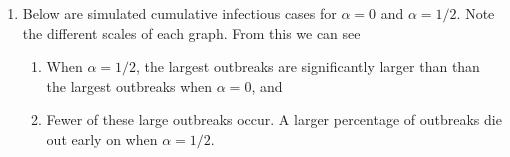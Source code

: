 \documentclass[10pt]{article}
\begin{document}
\begin{enumerate}
\begin{enumerate}
	\item 
		Below are simulated cumulative infectious cases for $\alpha=0$ and $\alpha=1/2$. Note the different scales of each graph. From this we can see
		\begin{enumerate}
			\item When $\alpha=1/2$, the largest outbreaks are significantly larger than than the largest outbreaks when $\alpha=0$, and
			\item Fewer of these large outbreaks occur. A larger percentage of outbreaks die out early on when $\alpha=1/2$.
		\end{enumerate}
		\begin{figure}[H]
			\centering

\end{figure}
\end{enumerate}
\end{enumerate}
\end{document}
